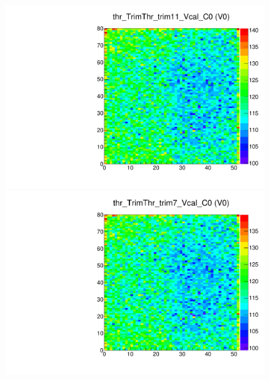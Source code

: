 \begin{figure}[!Hp]
\centering
\begin{minipage}{0.45\textwidth}
  \includegraphics[width=1.0\textwidth]{figures/trim_thr_TrimThr_trim11_Vcal.pdf}
  \caption{}
  \label{fig:trim_thr_TrimThr_trim11_Vcal}
\end{minipage}
\hspace{0.3cm}
\begin{minipage}{0.45\textwidth}
  \includegraphics[width=1.0\textwidth]{figures/trim_thr_TrimThr_trim7_Vcal.pdf}
  \caption{}
  \label{fig:trim_thr_TrimThr_trim7_Vcal}
\end{minipage}
\end{figure}



